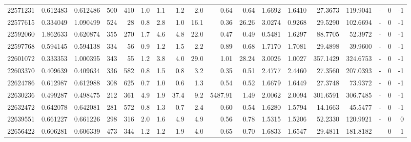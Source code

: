 \begin{tabular}{rrrrrrrrrrrrrrrlrr}
  22571231 & 0.612483 &   0.612486 &  500 &  410 &      1.0 &      1.1 &     1.2 &      2.0 &       0.64 &        0.64 &  1.6692 &  1.6410 &   27.3673 &  119.9041 &             - &        0 &         -1 \\
  22577615 & 0.334049 &   1.090499 &  524 &   28 &      0.8 &      2.8 &     1.0 &     16.1 &       0.36 &       26.26 &  3.0274 &  0.9268 &   29.5290 &  102.6694 &             - &        0 &         -1 \\
  22592060 & 1.862633 &   0.620874 &  355 &  270 &      1.7 &      4.6 &     4.8 &     22.0 &       0.47 &        0.49 &  0.5481 &  1.6297 &   88.7705 &   52.3972 &             - &        0 &         -1 \\
  22597768 & 0.594145 &   0.594138 &  334 &   56 &      0.9 &      1.2 &     1.5 &      2.2 &       0.89 &        0.68 &  1.7170 &  1.7081 &   29.4898 &   39.9600 &             - &        0 &         -1 \\
  22601072 & 0.333353 &   1.000395 &  343 &   55 &      1.2 &      3.8 &     4.0 &     29.0 &       1.01 &       28.24 &  3.0026 &  1.0027 &  357.1429 &  324.6753 &             - &        0 &         -1 \\
  22603370 & 0.409639 &   0.409634 &  336 &  582 &      0.8 &      1.5 &     0.8 &      3.2 &       0.35 &        0.51 &  2.4777 &  2.4460 &   27.3560 &  207.0393 &             - &        0 &         -1 \\
  22624786 & 0.612987 &   0.612988 &  308 &  625 &      0.7 &      1.0 &     0.6 &      1.3 &       0.54 &        0.52 &  1.6679 &  1.6449 &   27.3748 &   73.9372 &             - &        0 &         -1 \\
  22630236 & 0.499287 &   0.498475 &  212 &  361 &      4.9 &      1.9 &    37.4 &      9.2 &    5487.91 &        1.49 &  2.0062 &  2.0094 &  301.6591 &  306.7485 &             - &        0 &         -1 \\
  22632472 & 0.642078 &   0.642081 &  281 &  572 &      0.8 &      1.3 &     0.7 &      2.4 &       0.60 &        0.54 &  1.6280 &  1.5794 &   14.1663 &   45.5477 &             - &        0 &         -1 \\
  22639551 & 0.661227 &   0.661226 &  298 &  316 &      2.0 &      1.6 &     4.9 &      4.9 &       0.56 &        0.78 &  1.5315 &  1.5206 &   52.2330 &  120.9921 &             - &        0 &          0 \\
  22656422 & 0.606281 &   0.606339 &  473 &  344 &      1.2 &      1.2 &     1.9 &      4.0 &       0.65 &        0.70 &  1.6833 &  1.6547 &   29.4811 &  181.8182 &             - &        0 &         -1 \\

\end{tabular}
